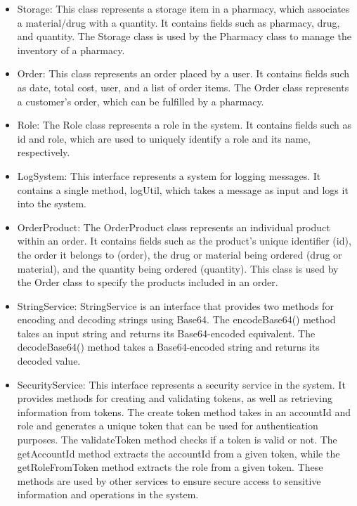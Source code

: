 \begin{itemize}
\item Storage: This class represents a storage item in a pharmacy, which associates a material/drug with a quantity. It contains fields such as pharmacy, drug, and quantity. The Storage class is used by the Pharmacy class to manage the inventory of a pharmacy.

\item Order: This class represents an order placed by a user. It contains fields such as date, total cost, user, and a list of order items. The Order class represents a customer's order, which can be fulfilled by a pharmacy.

\item Role: The Role class represents a role in the system. It contains fields such as id and role, which are used to uniquely identify a role and its name, respectively.

\item LogSystem: This interface represents a system for logging messages. It contains a single method, logUtil, which takes a message as input and logs it into the system. 

\item OrderProduct: The OrderProduct class represents an individual product within an order. It contains fields such as the product's unique identifier (id), the order it belongs to (order), the drug or material being ordered (drug or material), and the quantity being ordered (quantity). This class is used by the Order class to specify the products included in an order.

\item StringService: StringService is an interface that provides two methods for encoding and decoding strings using Base64. The encodeBase64() method takes an input string and returns its Base64-encoded equivalent. The decodeBase64() method takes a Base64-encoded string and returns its decoded value. 

\item SecurityService: This interface represents a security service in the system. It provides methods for creating and validating tokens, as well as retrieving information from tokens. The create token method takes in an accountId and role and generates a unique token that can be used for authentication purposes. The validateToken method checks if a token is valid or not. The getAccountId method extracts the accountId from a given token, while the getRoleFromToken method extracts the role from a given token. These methods are used by other services to ensure secure access to sensitive information and operations in the system.


\end{itemize}
